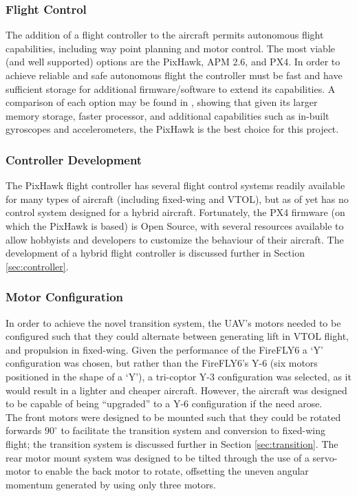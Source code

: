\subsubsection*{Flight Control}
The addition of a flight controller to the aircraft permits autonomous flight capabilities, including way point planning and motor control. The most viable (and well supported) options are the PixHawk\cite{ref:pixhawk}, APM 2.6\cite{ref:ardupilot}, and PX4\cite{ref:px4}. In order to achieve reliable and safe autonomous flight the controller must be fast and have sufficient storage for additional firmware/software to extend its capabilities. A comparison of each option may be found in \cite{ref:controller_comparison}, showing that given its larger memory storage, faster processor, and additional capabilities such as in-built gyroscopes and accelerometers, the PixHawk is the best choice for this project.

\subsubsection*{Controller Development}
The PixHawk flight controller has several flight control systems readily available for many types of aircraft (including fixed-wing and VTOL), but as of yet has no control system designed for a hybrid aircraft. Fortunately, the PX4 firmware (on which the PixHawk is based) is Open Source\cite{ref:ardupilotgit}, with several resources available\cite{ref:firmware1,ref:firmware2} to allow hobbyists and developers to customize the behaviour of their aircraft. The development of a hybrid flight controller is discussed further in Section \ref{sec:controller}.

\subsubsection*{Motor Configuration}
In order to achieve the novel transition system, the UAV's motors needed to be configured such that they could alternate between generating lift in VTOL flight, and propulsion in fixed-wing. Given the performance of the FireFLY6 a `Y' configuration was chosen, but rather than the FireFLY6's Y-6 (six motors positioned in the shape of a `Y'), a tri-coptor Y-3 configuration  was selected, as it would result in a lighter and cheaper aircraft. However, the aircraft was designed to be capable of being ``upgraded'' to a Y-6 configuration if the need arose.\\

The front motors were designed to be mounted such that they could be rotated forwards $90^{\circ}$ to facilitate the transition system and conversion to fixed-wing flight; the transition system is discussed further in Section \ref{sec:transition}. The rear motor mount system was designed to be tilted through the use of a servo-motor to enable the back motor to rotate, offsetting the uneven angular momentum generated by using only three motors.
		
